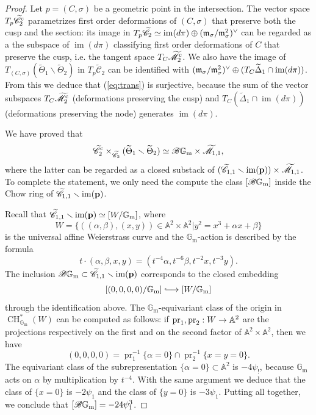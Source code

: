 \documentclass[a4paper, 10pt]{amsart}
\numberwithin{equation}{section}
\numberwithin{subsection}{section}
\theoremstyle{definition}
\theoremstyle{remark}
\renewcommand{\mathcal}{\mathscr}
\renewcommand\AA{\mathbb{A}} \newcommand\BB{\mathbb{B}}
\newcommand\GG{\mathbb{G}} \newcommand\HH{\mathbb{H}}
\newcommand\rmm{\mathrm{m}} \newcommand\rmn{\mathrm{n}}
\newcommand\arr{\ifinner\to\else\longrightarrow\fi}
\newcommand{\hooklongrightarrow}{\lhook\joinrel\longrightarrow}
\newcommand\im[1]{\operatorname{im}(#1)}
\newcommand\pr{\operatorname{pr}}
\renewcommand{\setminus}{\smallsetminus}
\newcommand{\gm}{\GG_{\rmm}}
\newcommand{\Mtilde}{\widetilde{\mathcal M}}
\newcommand{\Ctilde}{\widetilde{\mathcal C}}
\newcommand{\Dtilde}{\widetilde{\Delta}}
\newcommand{\ThTilde}{\widetilde{\Theta}}
\newcommand{\ch}[1][*]{\operatorname{CH}^{#1}}
\begin{document}
\begin{proof}
		Let $p=(C,\sigma)$ be a geometric point in the intersection. The vector space $T_p\Ctilde_2^{\rm c}$ parametrizes first order deformations of $(C,\sigma)$ that preserve both the cusp and the section: its image in $T_p \Ctilde_2\simeq \im{d\pi}\oplus(\frkm_{\sigma}/\frkm_{\sigma}^2)^\vee $ can be regarded as a the subspace of $\im{d\pi}$ classifying first order deformations of $C$ that preserve the cusp, i.e. the tangent space $T_C\Mtilde_2^{\rm c}$.
		We also have the image of $T_{(C,\sigma)}(\ThTilde_1 \setminus \ThTilde_2)$ in $T_p\Ctilde_2$ can be identified with $(\frkm_{\sigma}/\frkm_{\sigma}^2)^\vee \oplus (T_C\Dtilde_1\cap \im{d\pi})$. From this we deduce that (\ref{eq:trans}) is surjective, because the sum of the vector subspaces $T_{C}\Mtilde_2^{\rm c}$  (deformations preserving the cusp) and $T_C (\Dtilde_1\cap\im{d\pi})$ (deformations preserving the node) generates $\im{d\pi}$.
		
		We have proved that 
		$$\Ctilde_2^{\rm c} \times_{\Ctilde_2} (\ThTilde_1 \setminus \ThTilde_2) \simeq \cB\gm \times \Mtilde_{1,1},$$
		where the latter can be regarded as a closed substack of $ (\Ctilde_{1,1}\setminus \im{\bfp}) \times \Mtilde_{1,1}$.
		To complete the statement, we only need the compute the class $[\cB\gm]$ inside the Chow ring of $\Ctilde_{1,1} \setminus \im{\bfp}$.
		
		Recall that $\Ctilde_{1,1} \setminus \im{\bfp} \simeq [ W/\gm] $, where
		$$W=\{((\alpha,\beta),(x,y))  \in \AA^2 \times \AA^2 | y^2=x^3+\alpha x+ \beta\}$$
		is the universal affine Weierstrass curve and the $\gm$-action is described by the formula $$t\cdot(\alpha,\beta,x,y)=(t^{-4}\alpha,t^{-6}\beta,t^{-2}x,t^{-3}y).$$ The inclusion $\cB\gm \subset \Ctilde_{1,1} \setminus \im{\bfp} $ corresponds to the closed embedding 
		$$ [ (0,0,0,0)/\gm] \hooklongrightarrow [ W/\gm]$$
		through the identification above. 
		The $\gm$-equivariant class of the origin in $\ch_{\gm}(W)$ can be computed as follows: if $\pr_1,\pr_2:W\arr\AA^2$ are the projections respectively on the first and on the second factor of $\AA^2\times\AA^2$, then we have
		\[ (0,0,0,0) = \pr_1^{-1}\{\alpha=0\}\cap \pr_2^{-1}\{x=y=0\}. \]
		The equivariant class of the subrepresentation $\{\alpha=0\}\subset \AA^2$ is $-4\psi_!$, because $\gm$ acts on $\alpha$ by multiplication by $t^{-4}$. With the same argument we deduce that the class of $\{x=0\}$ is $-2\psi_1$ and the class of $\{y=0\}$ is $-3\psi_1$. Putting all together, we conclude that $[\cB\gm]=-24\psi_1^3$. 
		

\end{proof}
\end{document}
